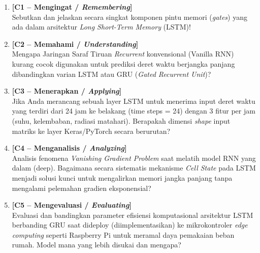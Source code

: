 \documentclass[11pt,a4paper]{article}
\begin{document}
\begin{enumerate}[leftmargin=1.8em, label=\textbf{Soal \arabic*.}]
    
    \item \textbf{[C1 -- Mengingat / \textit{Remembering}]} \\
    Sebutkan dan jelaskan secara singkat komponen pintu memori (\textit{gates}) yang ada dalam arsitektur \textit{Long Short-Term Memory} (LSTM)!
    \vspace{2.2cm}

    \item \textbf{[C2 -- Memahami / \textit{Understanding}]} \\
    Mengapa Jaringan Saraf Tiruan \textit{Recurrent} konvensional (Vanilla RNN) kurang cocok digunakan untuk prediksi deret waktu berjangka panjang dibandingkan varian LSTM atau GRU (\textit{Gated Recurrent Unit})?
    \vspace{2.8cm}

    \item \textbf{[C3 -- Menerapkan / \textit{Applying}]} \\
    Jika Anda merancang sebuah layer LSTM untuk menerima input deret waktu yang terdiri dari 24 jam ke belakang (time steps = 24) dengan 3 fitur per jam (suhu, kelembaban, radiasi matahari). Berapakah dimensi \textit{shape} input matriks ke layer Keras/PyTorch secara berurutan?
    \vspace{2.8cm}

    \newpage

    \item \textbf{[C4 -- Menganalisis / \textit{Analyzing}]} \\
    Analisis fenomena \textit{Vanishing Gradient Problem} saat melatih model RNN yang dalam (deep). Bagaimana secara sistematis mekanisme \textit{Cell State} pada LSTM menjadi solusi kunci untuk mengalirkan memori jangka panjang tanpa mengalami pelemahan gradien eksponensial?
    \vspace{3.5cm}

    \item \textbf{[C5 -- Mengevaluasi / \textit{Evaluating}]} \\
    Evaluasi dan bandingkan parameter efisiensi komputasional arsitektur LSTM berbanding GRU saat dideploy (diimplementasikan) ke mikrokontroler \textit{edge computing} seperti Raspberry Pi untuk meramal daya pemakaian beban rumah. Model mana yang lebih disukai dan mengapa?
    \vspace{3.5cm}


\end{enumerate}
\end{document}
